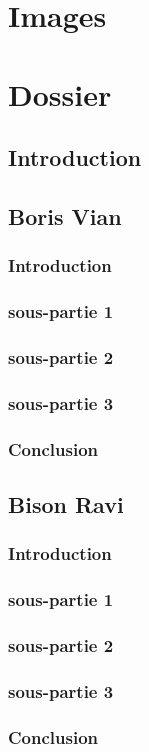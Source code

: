 \chapter{Images}
\chapter{Dossier}
\section{Introduction}
\section{Boris Vian}
\subsection{Introduction}
\subsection{sous-partie 1}
\subsection{sous-partie 2}
\subsection{sous-partie 3}
\subsection{Conclusion}
\section{Bison Ravi}
\subsection{Introduction}
\subsection{sous-partie 1}
\subsection{sous-partie 2}
\subsection{sous-partie 3}
\subsection{Conclusion}
